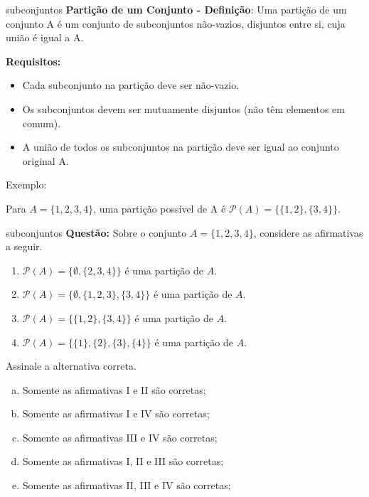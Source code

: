 \documentclass[aspectratio=169]{beamer}
\begin{document}
\begin{frame}{subconjuntos}
    \textbf{Partição de um Conjunto - Definição}: Uma partição de um conjunto A é um conjunto de subconjuntos não-vazios, disjuntos entre si, cuja união é igual a A.
    
    \vspace{4mm}
    \textbf{Requisitos:}

    \begin{itemize}
        \item Cada subconjunto na partição deve ser não-vazio.
        \item Os subconjuntos devem ser mutuamente disjuntos (não têm elementos em comum).
        \item A união de todos os subconjuntos na partição deve ser igual ao conjunto original A.
    \end{itemize}
    
    \vspace{4mm}
    Exemplo: 

    \vspace{2mm}

    Para $A=\{1,2,3,4\}$, uma partição possível de A é $\mathcal{P}(A) = \{\{1,2\},\{3,4\}\}$.
        
\end{frame}

\begin{frame}{subconjuntos}
    \textbf{Questão: }
    \noindent
Sobre o conjunto $A = \{1, 2, 3, 4\}$, considere as afirmativas a seguir.

\begin{enumerate}
    \item $\mathcal{P}(A) = \{\emptyset, \{2, 3, 4\}\}$ é uma partição de $A$.
    \item $\mathcal{P}(A) = \{\emptyset, \{1, 2, 3\}, \{3, 4\}\}$ é uma partição de $A$.
    \item $\mathcal{P}(A) = \{\{1, 2\}, \{3, 4\}\}$ é uma partição de $A$.
    \item $\mathcal{P}(A) = \{\{1\}, \{2\}, \{3\}, \{4\}\}$ é uma partição de $A$.
\end{enumerate}

\noindent
Assinale a alternativa correta.

\begin{enumerate}[a)]
    \item Somente as afirmativas I e II são corretas;
    \item Somente as afirmativas I e IV são corretas;
    \item Somente as afirmativas III e IV são corretas;
    \item Somente as afirmativas I, II e III são corretas;
    \item Somente as afirmativas II, III e IV são corretas;
\end{enumerate}
\end{frame}
\end{document}
